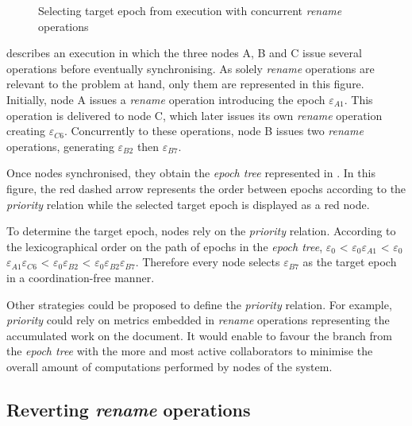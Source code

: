 \documentclass[10pt,journal,compsoc]{IEEEtran}
\let\MYoriglatexcaption\caption
\renewcommand{\caption}[2][\relax]{\MYoriglatexcaption[#2]{#2}}
\newcommand{\epoch}[1]{$\varepsilon_{#1}$}
\begin{document}
\begin{figure}[!ht]
{\begin{minipage}{\linewidth}
            \label{fig:priority-epoch-tree}
        \end{minipage}}
    \caption{Selecting target epoch from execution with concurrent \emph{rename} operations}
    \label{fig:priority-example}
\end{figure}

 describes an execution in which the three nodes A, B and C issue several operations before eventually synchronising.
As solely \emph{rename} operations are relevant to the problem at hand, only them are represented in this figure.
Initially, node A issues a \emph{rename} operation introducing the epoch \epoch{A1}.
This operation is delivered to node C, which later issues its own \emph{rename} operation creating \epoch{C6}.
Concurrently to these operations, node B issues two \emph{rename} operations, generating \epoch{B2} then \epoch{B7}.

Once nodes synchronised, they obtain the \emph{epoch tree} represented in .
In this figure, the red dashed arrow represents the order between epochs according to the \emph{priority} relation while the selected target epoch is displayed as a red node.

To determine the target epoch, nodes rely on the \emph{priority} relation.
According to the lexicographical order on the path of epochs in the \emph{epoch tree}, \epoch{0} < \epoch{0}\epoch{A1} < \epoch{0}\epoch{A1}\epoch{C6} < \epoch{0}\epoch{B2} < \epoch{0}\epoch{B2}\epoch{B7}.
Therefore every node selects \epoch{B7} as the target epoch in a coordination-free manner.

Other strategies could be proposed to define the \emph{priority} relation.
For example, \emph{priority} could rely on metrics embedded in \emph{rename} operations representing the accumulated work on the document.
It would enable to favour the branch from the \emph{epoch tree} with the more and most active collaborators to minimise the overall amount of computations performed by nodes of the system.

\subsection{Reverting \emph{rename} operations}
\end{document}
